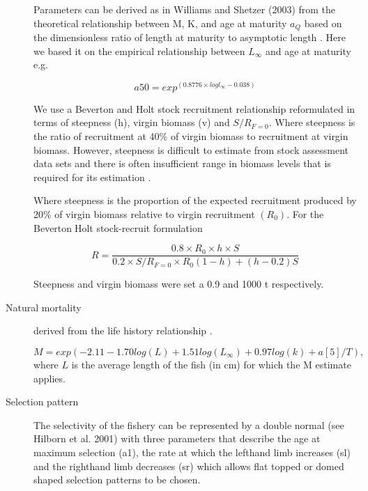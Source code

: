 \documentclass[10pt]{article}
\begin{document}
\begin{description}
Parameters can be derived as in Williams and Shetzer (2003) from the theoretical relationship between M, K, and age at maturity $a_{Q}$ 
based on the dimensionless ratio of length at maturity to asymptotic length \cite{beverton1992patterns}. Here we based it on the empirical relationship
between $L_{\infty}$ and age at maturity \cite{froese2000empirical} e.g.

\begin{equation}
  a50=exp^(0.8776 \times logl_{\infty}-0.038)
\end{equation}

We use a Beverton and Holt stock recruitment relationship reformulated in terms of steepness (h), virgin biomass (v) and $S/R_{F=0}$. 
Where steepness is the ratio of recruitment at 40\% of virgin biomass to recruitment at virgin biomass. However, steepness is difficult to estimate from 
stock assessment data sets and there is often insufficient range in biomass levels that is required for its estimation \cite{ISSF2011steep}.

Where steepness is the proportion of the expected recruitment produced by 20\% of virgin biomass relative to virgin recruitment $(R_0)$. For the BevertonHolt 
stock-recruit formulation

\begin{equation}
R=\frac{0.8 \times R_0 \times h \times S}{0.2 \times S/R_{F=0} \times R_0(1-h)+(h-0.2)S}
\end{equation} 

Steepness and virgin biomass were set a 0.9 and 1000 t respectively.

 \item[Natural mortality]  derived from the life history relationship \cite{gislason2008does}.
               
\begin{equation}
            M = exp(-2.11 -1.70log(L) + 1.51log(L_{\infty}) + 0.97log(k) + a[5]/T),
\end{equation} 
where $L$ is the average length of the fish (in cm) for which the M estimate applies.

 \item[Selection pattern] 

The selectivity of the fishery can be represented by a double normal 
(see Hilborn et al. 2001) with three parameters that describe the age at maximum selection (a1), the rate at which the lefthand 
       limb increases (sl) and the righthand limb decreases (sr) which allows flat topped or domed shaped selection patterns to be chosen.


\end{description}
\end{document}
